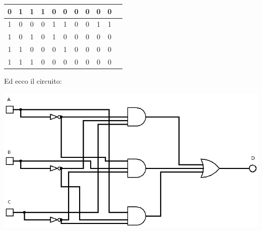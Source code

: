 \documentclass[a4paper,12pt, oneside]{book}
\begin{document}
\begin{esercizio}
\begin{center}
\begin{tabular}{|c|c|c|c|c|c|c|c|c|c|c|}
			\hline
			0   & 1   & 1   & 1              & 0              & 0              & 0                                         & 0                                         & 0                                        & 0            \\
			\hline
			1   & 0   & 0   & 0              & 1              & 1              & 0                                         & 0                                         & 1                                        & 1            \\
			\hline
			1   & 0   & 1   & 0              & 1              & 0              & 0                                         & 0                                         & 0                                        & 0            \\
			\hline
			1   & 1   & 0   & 0              & 0              & 1              & 0                                         & 0                                         & 0                                        & 0            \\
			\hline
			1   & 1   & 1   & 0              & 0              & 0              & 0                                         & 0                                         & 0                                        & 0            \\
			\hline
		\end{tabular}
	\end{center}
	\newpage
	Ed ecco il circuito:
	\begin{center}
		\includegraphics[scale=0.65]{img/es4.png}
	\end{center}
\end{esercizio}
\end{document}
